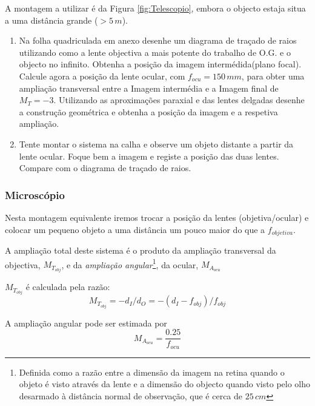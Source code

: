 \documentclass[a4paper,12pt]{article}      %
\begin{document}
A montagem  a utilizar é da Figura \ref{fig:Telescopio}, embora o objecto estaja situa a uma distância grande ($> 5 \, m$). 


\begin{enumerate}
\item Na folha quadriculada em anexo desenhe um diagrama de traçado de raios utilizando como a lente objectiva a mais potente do trabalho de O.G.  e o objecto no infinito. Obtenha a posição da imagem intermédida(plano focal). Calcule agora a posição da lente ocular, com $f_{ocu}=150\,mm$, para obter uma ampliação transversal entre a Imagem intermédia e a Imagem final de $M_T=-3$. Utilizando as aproximações paraxial e das lentes delgadas desenhe a construção geométrica e obtenha a posição da imagem e a respetiva ampliação.
\item Tente montar o sistema na calha e observe um objeto distante a partir da lente ocular. Foque bem a imagem e registe a posição das duas lentes. Compare com o diagrama de traçado de raios.
\end{enumerate}

\subsubsection{\sf  Microscópio}

Nesta montagem equivalente iremos trocar a posição da lentes (objetiva/ocular) e colocar um pequeno objeto a uma distância um pouco maior do que a $f_{objetiva}$. 

A ampliação total deste sistema é o produto da ampliação transversal da objectiva, $M_{T_{obj}}$,  e da \emph{ampliação angular}\footnote{Definida como a razão entre a dimensão da imagem na retina quando o objeto é visto através da lente e a dimensão do objecto quando visto pelo olho desarmado à distância normal de observação, que é cerca de $25\,cm$}, da ocular, $M_{A_{ocu}}$ 
 
$M_{T_{obj}}$ é calculada pela razão:
$$M_{T_{obj}}=-d_I/d_O=-(d_I - f_{obj})/f_{obj}$$

A ampliação angular pode ser estimada por 
$$M_{A_{ocu}}= \frac{0.25}{f_{ocu}}$$
\end{document}
